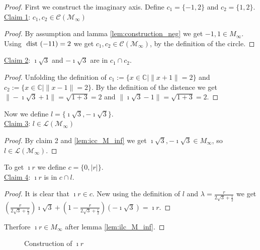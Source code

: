 \begin{proof}
    First we construct the imaginary axis. Define $c_1 = \{-1,2\}$ and $c_2 = \{1,2\}$.\\
    \underline{Claim 1}: $c_1, c_2 \in \mathcal{C(M_{\infty})}$
    \begin{proof}
        By assumption and lamma \ref{lem:construction_neg} we get $-1, 1 \in M_{\infty}$. Using $\text{ dist }(-1 1)=2$ we get $c_1, c_2 \in \mathcal{C(M_{\infty})}$, by the definition of the circle.
    \end{proof}
    \underline{Claim 2}: $\imath\sqrt{3}$ and $-\imath\sqrt{3}$ are in $c_1 \cap c_2$.
    \begin{proof}
        Unfolding the definition of $c_1:=\{x\in\mathbb{C} \mid\|x+1\|=2\}$ and $c_2:=\{x\in\mathbb{C} \mid\|x-1\|=2\}$.
        By the definition of the distence we get $\|-\imath\sqrt{3}+1\| = \sqrt{1 + 3} = 2$ and $\|\imath\sqrt{3}-1\| = \sqrt{1 + 3} = 2$.
    \end{proof}
    Now we define $l = \{\imath\sqrt{3}, -\imath\sqrt{3}\}$.\\
    \underline{Claim 3}: $l \in \mathcal{L(M_{\infty})}$
    \begin{proof}
        By claim 2 and \ref{lem:icc_M_inf} we get $\imath\sqrt{3}, -\imath\sqrt{3} \in M_{\infty}$, so $l \in \mathcal{L(M_{\infty})}$.
    \end{proof}
    To get $\imath r$ we define $c = \{0,|r|\}$.\\
    \underline{Claim 4}: $\imath r$ is in $c \cap l$.
    \begin{proof}
        It is clear that $\imath r \in c$. New using the definition of $l$ and $\lambda = \frac{r}{2\sqrt{3}+\frac{1}{2}}$ we get $(\frac{r}{2\sqrt{3}+\frac{r}{2}})\imath\sqrt{3} + (1-\frac{r}{2\sqrt{3}+\frac{r}{2}})(-\imath\sqrt{3}) = \imath r$. 
    \end{proof}
    Therfore $\imath r \in M_{\infty}$ after lemma \ref{lem:ilc_M_inf}.
\end{proof}
\begin{figure}[h]
    \centering
    \caption{Construction of $\imath r$}
    \label{Fig.4}
\end{figure}

